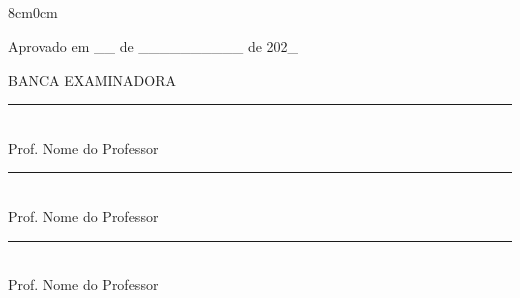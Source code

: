 \begin{center}
  \emanuel\\
  \henrique\\
  \lucas\\
  \valerio\\
  \wanderson

  \vspace{2.5cm}

  \textbf{\titulo}

  \vspace{1.5cm}

  \begin{singlespace}
    \begin{adjustwidth}{8cm}{0cm}
      \parbox{\linewidth}{\naturezadotrabalho}
    \end{adjustwidth}
  \end{singlespace}

  \vspace{1cm}

  \begin{flushleft}
    Aprovado em \_\_ de \_\_\_\_\_\_\_\_\_\_ de 202\_
  \end{flushleft}

  \vspace{1cm}

  BANCA EXAMINADORA

  \vspace{1cm}

  \noindent\rule{8cm}{0.4pt}\\
  Prof. Nome do Professor\\
  \universidadePaulista

  \vspace{0.5cm}

  \noindent\rule{8cm}{0.4pt}\\
  Prof. Nome do Professor\\
  \universidadePaulista

  \vspace{0.5cm}

  \noindent\rule{8cm}{0.4pt}\\
  Prof. Nome do Professor\\
  \universidadePaulista

\end{center}

\thispagestyle{empty}
\newpage
